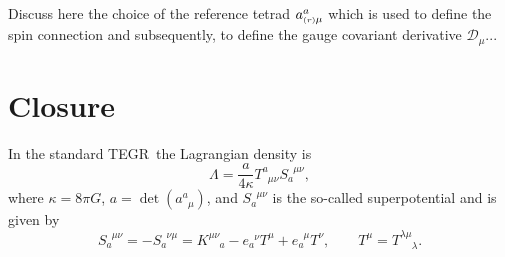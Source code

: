 \documentclass[
10pt, %
a4paper, %
oneside, %
headinclude,footinclude, %
BCOR5mm, %
]{scrartcl}
\newcommand{\itetr}[2]{e^{\phantom{#2}#1}_{#2}}
\newcommand{\tetr}[2]{a^{#1}_{\phantom{#1}#2}}
\newcommand{\rtetr}[2]{a^{#1}_{\mathsmaller{(r)} #2}}
\newcommand{\D}[1]{\mathcal{D}_{#1}} %
\newcommand{\Tors}[2]{T^{#1}_{\phantom{a}#2}}
\newcommand{\Supp}[2]{S_{#1}^{\phantom{a}#2}}	%
\newcommand{\tegr}{TEGR}
\begin{document}
Discuss here the choice of the reference tetrad $ \rtetr{a}{\mu} $ which is used to define the spin 
connection and 
subsequently, to define the gauge covariant derivative $ \D{\mu} $...


\section{Closure}



In the standard \tegr\ the Lagrangian density is %
\begin{equation}
\Lambda = \frac{a}{4\kappa} \Tors{a}{\mu\nu}\Supp{a}{\mu\nu},
\end{equation}
where $ \kappa = 8 \pi G $, $ a = \det(\tetr{a}{\mu}) $, and $ \Supp{a}{\mu\nu} $ is the so-called 
superpotential and is given by
\begin{equation}
\Supp{a}{\mu\nu} = -\Supp{a}{\nu\mu} = K^{\mu\nu}_{\phantom{\mu\nu}a} - \itetr{\nu}{a} T^\mu + 
\itetr{\mu}{a} 
T^\nu, \qquad T^\mu = T^{\lambda\mu}_{\phantom{\lambda\mu}\lambda}.
\end{equation}



\printbibliography
\end{document}
